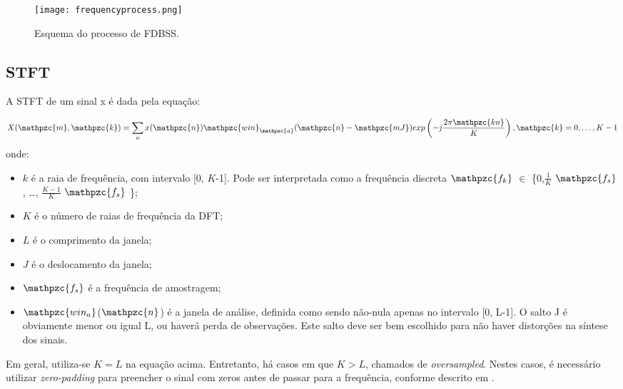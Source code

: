         \begin{figure}[h!]
            \texttt{[image: frequencyprocess.png]}
            \caption{Esquema do processo de FDBSS.}
            \label{fig:frequencymodel}
        \end{figure}

    \subsection{STFT} \label{sec:stft}
        A STFT de um sinal x é dada pela equação:

    \begin{equation}\label{eq:STFT}
        X(\mathpzc{m},\mathpzc{k})
        = \sum_{n} x(\mathpzc{n})
        \mathpzc{win}_\mathpzc{a}(\mathpzc{n} - \mathpzc{mJ})
        exp \left( -j \frac{2\pi\mathpzc{kn}}{K} \right), \mathpzc{k} = 0, \dots, K-1
    \end{equation}
    onde:
    \begin{itemize}
        
        \item $k$ é a raia de frequência, com intervalo [0, $K$-1]. Pode ser interpretada como a frequência discreta $\mathpzc{f_k}$ $\in$ \big\{0,$\frac{1}{K}$ $\mathpzc{f_s}$, \dots, $\frac{K-1}{K}$ $\mathpzc{f_s}$ \big\};
                    
        \item $K$ é o número de raias de frequência da DFT;
                    
        \item $L$ é o comprimento da janela;
                    
        \item $J$ é o deslocamento da janela;
        
        \item  $\mathpzc{f_s}$ é a frequência de amostragem;
        
        \item $\mathpzc{win_a}$($\mathpzc{n}$) é a janela de análise, definida como sendo não-nula apenas no intervalo [0, L-1]. O salto J é obviamente menor ou igual L, ou haverá perda de observações. Este salto deve ser bem escolhido para não haver distorções na síntese dos sinais.
    \end{itemize}
    
        Em geral, utiliza-se $K=L$ na equação acima. Entretanto, há casos em que $K>L$, chamados de \textit{oversampled}. Nestes casos, é necessário utilizar \textit{zero-padding} para preencher o sinal com zeros antes de passar para a frequência, conforme descrito em \cite{STFT}.
        
